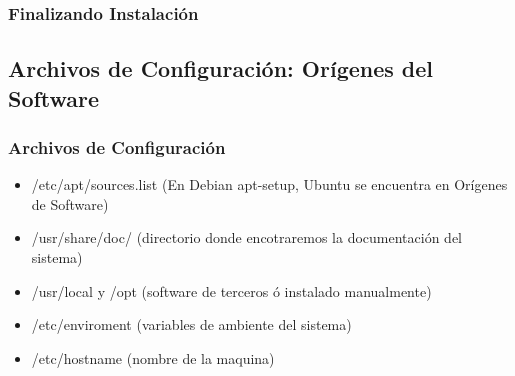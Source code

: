 \documentclass{beamer}
\begin{document}
\begin{frame}
\frametitle{Finalizando Instalaci\'on} 
\end{frame}

\subsection{Archivos de Configuraci\'on: Orígenes del Software}
\begin{frame}
\frametitle{Archivos de Configuraci\'on}
\begin{itemize}
	\item /etc/apt/sources.list (En Debian apt-setup, Ubuntu se encuentra en Or\'igenes de Software)
	\item /usr/share/doc/ (directorio donde encotraremos la documentaci\'on del sistema)
	\item /usr/local y /opt (software de terceros \'o instalado  manualmente)
	\item /etc/enviroment (variables de ambiente del sistema)
	\item /etc/hostname (nombre de la maquina)
\end{itemize}
\end{frame}
\end{document}
